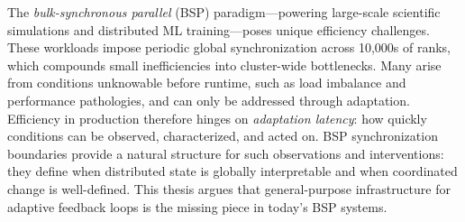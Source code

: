 The \emph{bulk-synchronous parallel} (BSP) paradigm---powering large-scale scientific simulations and
distributed ML training---poses unique efficiency challenges.
These workloads impose periodic global synchronization across 10,000s of ranks, which compounds
small inefficiencies into cluster-wide bottlenecks.
Many arise from conditions unknowable before runtime, such as load imbalance and performance
pathologies, and can only be addressed through adaptation.
Efficiency in production therefore hinges on \emph{adaptation latency}: how quickly conditions can
be observed, characterized, and acted on.
BSP synchronization boundaries provide a natural structure for such observations and interventions: they define when
distributed state is globally interpretable and when coordinated change is well-defined.
This thesis argues that general-purpose infrastructure
for adaptive feedback loops
is the missing piece in today's BSP systems.





